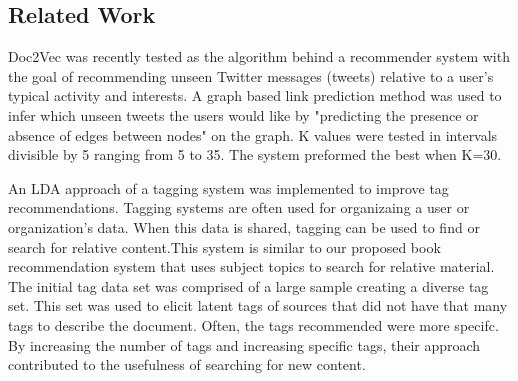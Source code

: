 \subsection{Related Work}
\label{sec:related-work}

Doc2Vec was recently tested as the algorithm behind a recommender system with the goal of recommending unseen Twitter messages (tweets) relative to a user's typical activity and interests. A graph based link prediction method was used to infer which unseen tweets the users would like by "predicting the presence or absence of edges between nodes" on the graph.  \cite{RefWorks:doc:5a6e5746e4b0d609eec798d9} K values were tested in intervals divisible by 5 ranging from 5 to 35. The system preformed the best when K=30.

An LDA approach of a tagging system was implemented to improve tag recommendations. \cite{RefWorks:doc:5a73e055e4b0cf1dd767b18f} Tagging systems are often used for organizaing a user or organization's data. When this data is shared, tagging can be used to find or search for relative content.This system is similar to our proposed book recommendation system that uses subject topics to search for relative material. The initial tag data set was comprised of a large sample creating a diverse tag set. This set was used to elicit latent tags of sources that did not have that many tags to describe the document. Often, the tags recommended were more specifc. By increasing the number of tags and increasing specific tags, their approach contributed to the usefulness of searching for new content. 



